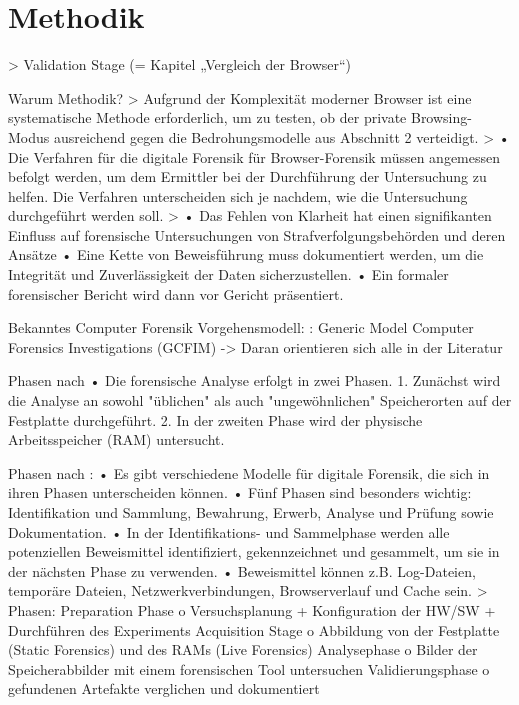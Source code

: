 \chapter{Methodik}

> Validation Stage (= Kapitel „Vergleich der Browser“)

Warum Methodik? 
	> \cite{Aggarwal.2010}
		Aufgrund der Komplexität moderner Browser ist eine systematische Methode erforderlich, um zu testen, ob der private Browsing-Modus ausreichend gegen die Bedrohungsmodelle aus Abschnitt 2 verteidigt.		
	> \cite{Izzati.2022}
		•	Die Verfahren für die digitale Forensik für Browser-Forensik müssen angemessen befolgt werden, um dem Ermittler bei der Durchführung der Untersuchung zu helfen. Die Verfahren unterscheiden sich je nachdem, wie die Untersuchung durchgeführt werden soll.
	> \cite{Horsman.2019}
		•	Das Fehlen von Klarheit hat einen signifikanten Einfluss auf forensische Untersuchungen von Strafverfolgungsbehörden und deren Ansätze
		•	Eine Kette von Beweisführung muss dokumentiert werden, um die Integrität und Zuverlässigkeit der Daten sicherzustellen.
		•	Ein formaler forensischer Bericht wird dann vor Gericht präsentiert.
	
	
Bekanntes Computer Forensik Vorgehensmodell: \cite{Yusoff.2011}: Generic Model Computer Forensics Investigations (GCFIM) -> Daran orientieren sich alle in der Literatur


Phasen nach \cite{Montasari.2015}
	•	Die forensische Analyse erfolgt in zwei Phasen.
	1.	Zunächst wird die Analyse an sowohl "üblichen" als auch "ungewöhnlichen" Speicherorten auf der Festplatte durchgeführt.
	2.	In der zweiten Phase wird der physische Arbeitsspeicher (RAM) untersucht.


Phasen nach \cite{Izzati.2022}:
	•	Es gibt verschiedene Modelle für digitale Forensik, die sich in ihren Phasen unterscheiden können.
	•	Fünf Phasen sind besonders wichtig: Identifikation und Sammlung, Bewahrung, Erwerb, Analyse und Prüfung sowie Dokumentation.
	•	In der Identifikations- und Sammelphase werden alle potenziellen Beweismittel identifiziert, gekennzeichnet und gesammelt, um sie in der nächsten Phase zu verwenden.
	•	Beweismittel können z.B. Log-Dateien, temporäre Dateien, Netzwerkverbindungen, Browserverlauf und Cache sein.
	> Phasen:
		Preparation Phase
		o	Versuchsplanung + Konfiguration der HW/SW + Durchführen des Experiments Acquisition Stage
		o	Abbildung von der Festplatte (Static Forensics) und des RAMs (Live Forensics) Analysephase
		o	Bilder der Speicherabbilder mit einem forensischen Tool untersuchen	Validierungsphase
		o	gefundenen Artefakte verglichen und dokumentiert



